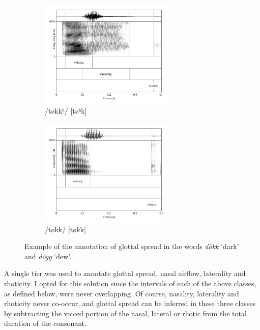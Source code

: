 \documentclass[11pt,a4paper,openany]{memoir}\usepackage[]{graphicx}\usepackage[]{color}
\begin{document}
\begin{figure}
\begin{subfigure}{\textwidth}
\centering
\includegraphics[width=0.7\textwidth]{dokk-spr}
\caption{/tøkkʰ/ [tøʰk]}
\end{subfigure}
\begin{subfigure}{\textwidth}
\centering
\includegraphics[width=0.7\textwidth]{dogg-spr}
\caption{/tøkk/ [tøkk]}
\end{subfigure}
\caption[Annotation of glottal spread]{Example of the annotation of glottal spread in the words \textit{dökk} `dark' and \textit{dögg} `dew'.}
\label{f:spreding}
\end{figure}


A single tier was used to annotate glottal spread, nasal airflow, laterality and rhoticity.
I opted for this solution since the intervals of each of the above classes, as defined below, were never overlapping.
Of course, nasality, laterality and rhoticity never co-occur, and glottal spread can be inferred in these three classes by subtracting the voiced portion of the nasal, lateral or rhotic from the total duration of the consonant.
\end{document}
